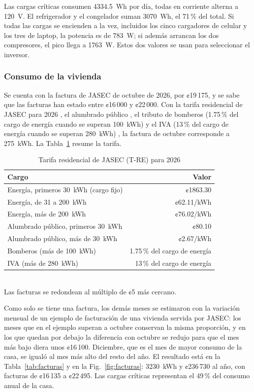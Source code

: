 Las cargas críticas consumen \SI{4334.5}{Wh} por día, todas en corriente alterna a \SI{120}{V}. El refrigerador y el congelador suman \SI{3070}{Wh}, el 71\,\% del total. Si todas las cargas se encienden a la vez, incluidos los cinco cargadores de celular y los tres de laptop, la potencia es de \SI{783}{W}; si además arrancan los dos compresores, el pico llega a \SI{1763}{W}. Estos dos valores se usan para seleccionar el inversor.

\subsubsection{Consumo de la vivienda}

Se cuenta con la factura de JASEC de octubre de 2026, por ¢19\,175, y se sabe que las facturas han estado entre ¢16\,000 y ¢22\,000. Con la tarifa residencial de JASEC para 2026 \cite{aresep_tre}, el alumbrado público \cite{aresep_ap}, el tributo de bomberos (1.75\,\% del cargo de energía cuando se superan \SI{100}{kWh}) \cite{ley8992} y el IVA (13\,\% del cargo de energía cuando se superan \SI{280}{kWh}) \cite{ley9635}, la factura de octubre corresponde a \SI{275}{kWh}. La Tabla~\ref{tab:tarifa} resume la tarifa.

\begin{table}[!htb]
\caption{Tarifa residencial de JASEC (T-RE) para 2026}
\label{tab:tarifa}
\centering
\footnotesize
\begin{tabular}{l r}
\toprule
Cargo & Valor \\
\midrule
Energía, primeros \SI{30}{kWh} (cargo fijo) & ¢1863.30 \\
Energía, de 31 a \SI{200}{kWh} & ¢62.11/kWh \\
Energía, más de \SI{200}{kWh} & ¢76.02/kWh \\
Alumbrado público, primeros \SI{30}{kWh} & ¢80.10 \\
Alumbrado público, más de \SI{30}{kWh} & ¢2.67/kWh \\
Bomberos (más de \SI{100}{kWh}) & 1.75\,\% del cargo de energía \\
IVA (más de \SI{280}{kWh}) & 13\,\% del cargo de energía \\
\bottomrule
\end{tabular}
\\[2pt]
{\footnotesize Las facturas se redondean al múltiplo de ¢5 más cercano.}
\end{table}

Como solo se tiene una factura, los demás meses se estimaron con la variación mensual de un ejemplo de facturación de una vivienda servida por JASEC: los meses que en el ejemplo superan a octubre conservan la misma proporción, y en los que quedan por debajo la diferencia con octubre se redujo para que el mes más bajo diera unos ¢16\,100. Diciembre, que es el mes de mayor consumo de la casa, se igualó al mes más alto del resto del año. El resultado está en la Tabla~\ref{tab:facturas} y en la Fig.~\ref{fig:facturas}: \SI{3230}{kWh} y ¢236\,730 al año, con facturas de ¢16\,135 a ¢22\,495. Las cargas críticas representan el 49\,\% del consumo anual de la casa.

